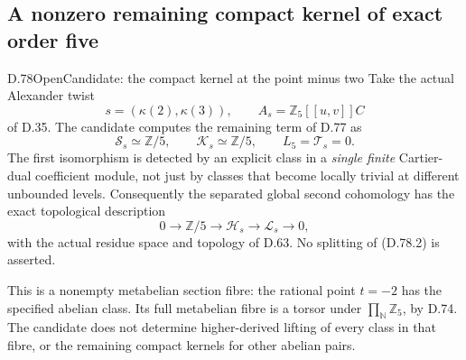 \subsection{A nonzero remaining compact kernel of exact order five}

\begin{statement}{D.78}{Open}{Candidate: the compact kernel at the point minus two}
Take the actual Alexander twist
\[
 s=(\kappa(2),\kappa(3)),\qquad A_s=\mathbb Z_5[[u,v]]C
\]
of D.35. The candidate computes the remaining term of D.77 as
\[
 \mathcal S_s\simeq\mathbb Z/5,\qquad
 \mathcal K_s\simeq\mathbb Z/5,\qquad L_5=\mathcal T_s=0.
                                                               \tag{D.78.1}
\]
The first isomorphism is detected by an explicit class in a
\emph{single finite} Cartier-dual coefficient module, not just by
classes that become locally trivial at different unbounded levels.
Consequently the separated global second cohomology has the exact
topological description
\[
 0\longrightarrow\mathbb Z/5\longrightarrow\mathcal H_s
       \longrightarrow\mathcal L_s\longrightarrow0,     \tag{D.78.2}
\]
with the actual residue space and topology of D.63. No splitting
of (D.78.2) is asserted.

This is a nonempty metabelian section fibre: the rational point
\(t=-2\) has the specified abelian class. Its full metabelian
fibre is a torsor under \(\prod_{\mathbb N}\mathbb Z_5\), by D.74.
The candidate does not determine higher-derived lifting of every
class in that fibre, or the remaining compact kernels for other
abelian pairs.
\end{statement}

